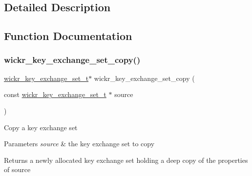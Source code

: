 \subsection{Detailed Description}


\subsection{Function Documentation}
\mbox{\label{group__wickr__key__exchange__set_ga102baafda8804a97acc5e2a5bc6f7dba}} 
\subsubsection{\texorpdfstring{wickr\+\_\+key\+\_\+exchange\+\_\+set\+\_\+copy()}{wickr\_key\_exchange\_set\_copy()}}
{\footnotesize\ttfamily \mbox{\hyperlink{structwickr__key__exchange__set}{wickr\+\_\+key\+\_\+exchange\+\_\+set\+\_\+t}}$\ast$ wickr\+\_\+key\+\_\+exchange\+\_\+set\+\_\+copy (\begin{DoxyParamCaption}\item[{const \mbox{\hyperlink{structwickr__key__exchange__set}{wickr\+\_\+key\+\_\+exchange\+\_\+set\+\_\+t}} $\ast$}]{source }\end{DoxyParamCaption})}

Copy a key exchange set


\begin{DoxyParams}{Parameters}
{\em source} & the key exchange set to copy \\
\hline
\end{DoxyParams}
\begin{DoxyReturn}{Returns}
a newly allocated key exchange set holding a deep copy of the properties of \textquotesingle{}source\textquotesingle{} 
\end{DoxyReturn}
\mbox{\label{group__wickr__key__exchange__set_ga9d247f82fda4d9ad7cb6784cd591c90e}} 
